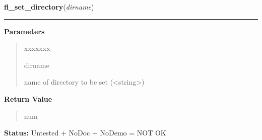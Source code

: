     \label{xformslib:library:fl_set_directory}

    \vspace{0.5ex}

\hspace{.8\funcindent}\begin{boxedminipage}{\funcwidth}

    \raggedright \textbf{fl\_set\_directory}(\textit{dirname})

    \vspace{-1.5ex}

    \rule{\textwidth}{0.5\fboxrule}
\setlength{\parskip}{2ex}
\setlength{\parskip}{1ex}
      \textbf{Parameters}
      \vspace{-1ex}

      \begin{quote}
        \begin{Ventry}{xxxxxxx}

          \item[dirname]

          name of directory to be set ({\textless}string{\textgreater})

        \end{Ventry}

      \end{quote}

      \textbf{Return Value}
    \vspace{-1ex}

      \begin{quote}
      num

      \end{quote}

\textbf{Status:} Untested + NoDoc + NoDemo = NOT OK



    \end{boxedminipage}

    \label{xformslib:library:fl_set_pattern}

    \vspace{0.5ex}

